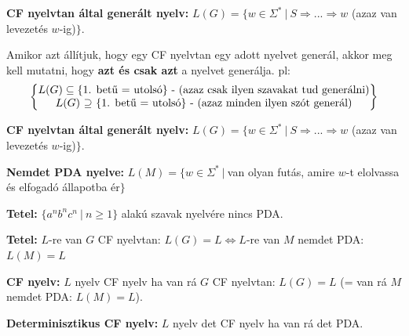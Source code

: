 \documentclass[a4paper]{article}
\begin{document}
\begin{tcolorbox}[size = fbox]
  \textbf{CF nyelvtan által generált nyelv:} $L(G) = \{w \in \Sigma^{*}\ |\ S \Rightarrow ... \Rightarrow w$ (azaz van levezetés $w$-ig)$\}$.
\end{tcolorbox}

\begin{tcolorbox}[colback = blue!5, colframe = blue, size = fbox]
Amikor azt állítjuk, hogy egy CF nyelvtan egy adott nyelvet generál, akkor meg kell mutatni, hogy \textbf{azt és csak azt} a nyelvet generálja. pl: \\
\[
  \begin{Bmatrix} 
    L(G) \subseteq \{ \text{1. betű = utolsó} \} \text{ - (azaz csak ilyen szavakat tud generálni)} \\
    L(G)\ \text{\reflectbox{$\subseteq$}}\ \{ \text{1. betű = utolsó} \} \text{ - (azaz minden ilyen szót generál)}
  \end{Bmatrix}
\]
\end{tcolorbox}

\begin{tcolorbox}[size = fbox]
  \textbf{CF nyelvtan által generált nyelv:} $L(G) = \{w \in \Sigma^{*}\ |\ S \Rightarrow ... \Rightarrow w$ (azaz van levezetés $w$-ig)$\}$.
\end{tcolorbox}

\begin{tcolorbox}[size = fbox]
  \textbf{Nemdet PDA nyelve:} $L(M) = \{w \in \Sigma^{*}\ |\ $van olyan futás, amire $w$-t elolvassa és elfogadó állapotba ér$\}$
\end{tcolorbox}

\begin{tcolorbox}[size = fbox]
  \textbf{Tetel:} $\{a^{n}b^{n}c^{n}\ |\ n \geq 1 \}$ alakú szavak nyelvére nincs PDA.
\end{tcolorbox}

\begin{tcolorbox}[size = fbox]
  \textbf{Tetel:} $L$-re van $G$ CF nyelvtan: $L(G) = L \Longleftrightarrow L$-re van $M$ nemdet PDA: $L(M) = L$
\end{tcolorbox}

\begin{tcolorbox}[size = fbox]
  \textbf{CF nyelv:} $L$ nyelv CF nyelv ha van rá $G$ CF nyelvtan: $L(G) = L$ (= van rá $M$ nemdet PDA: $L(M) = L$).
\end{tcolorbox}

\begin{tcolorbox}[size = fbox]
  \textbf{Determinisztikus CF nyelv:} $L$ nyelv det CF nyelv ha van rá det PDA.
\end{tcolorbox}
\end{document}
